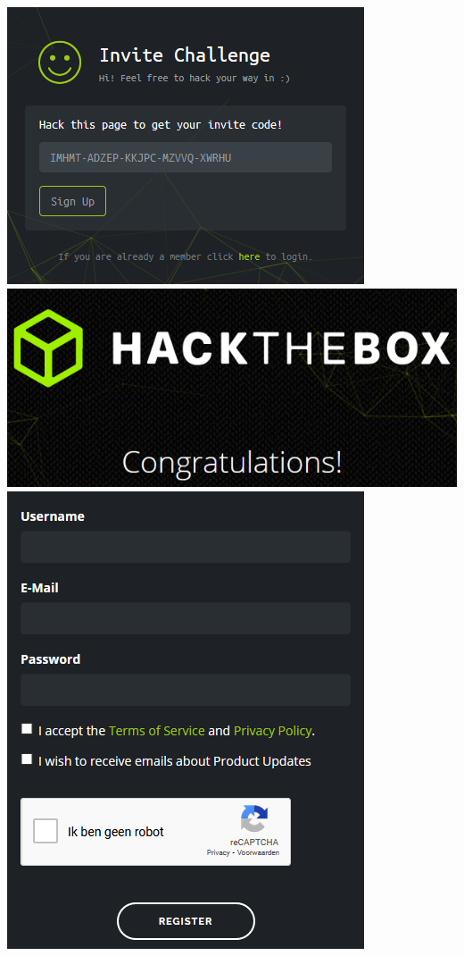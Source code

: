 \documentclass[../main.tex]{subfiles}
\begin{document}
\begin{center}
    \includegraphics[width=0.75\linewidth]{images/hackthebox_finished.png}
    \includegraphics[width=0.75\linewidth]{images/hackthebox_finished2.png}
    \includegraphics[width=0.75\linewidth]{images/hackthebox_finished3.png}
\end{center}
\end{document}
